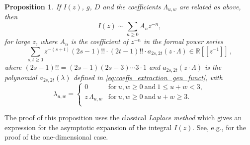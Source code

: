 \documentclass[english]{ourlematemasingle}
\numberwithin{theorem}{section}
\newtheorem{proposition}[theorem]{Proposition}
\theoremstyle{remark}
\newcommand{\R}{\mathbb{R}}
\newcommand{\ol}{\Lambda}
\begin{document}
\begin{proposition}
\label{prop:laplace}
If $I(z)$, $g$, $D$ and the coefficients $\ol_{u,w}$ are related as above, then
\[
I(z) \sim \sum_{n\geq 0} A_n z^{-n},
\]
for large $z$, where $A_n$ is the coefficient of $z^{-n}$ in the formal power series
\[
    \sum_{s,t\geq 0} z^{-(s+t)} (2s-1)!! \cdot (2t-1)!! \cdot a_{2s,2t} (z \cdot \ol) \in \R[[z^{-1}]]\,,
\]
where $(2s-1)!! = (2s-1)(2s-3)\cdots 3\cdot 1$ and $a_{2s,2t} (z \cdot \ol)$ is the polynomial $a_{2s,2t}(\lambda)$ defined in \eqref{eq:coeffs_extraction_gen_funct},
with 
\begin{equation}
    \label{eq:substitution_lambda_Lambda}
    \lambda_{u,w} = \left\{ \begin{array}{ll}
        0 & \text{for}~ u,w\geq 0 ~\text{and}~ 1 \leq u+w < 3, \\
        z\,\Lambda_{u,w} & \text{for}~ u,w\geq 0 ~\text{and}~ u+w \geq 3 .\\
    \end{array} \right.
\end{equation}
\end{proposition}


The proof of this proposition uses the classical \emph{Laplace method} which gives an expression for the asymptotic expansion of the integral $I(z)$.  See, e.g., \cite[Appendix A]{borinsky2019euler} for the proof of the one-dimensional case.
\end{document}
